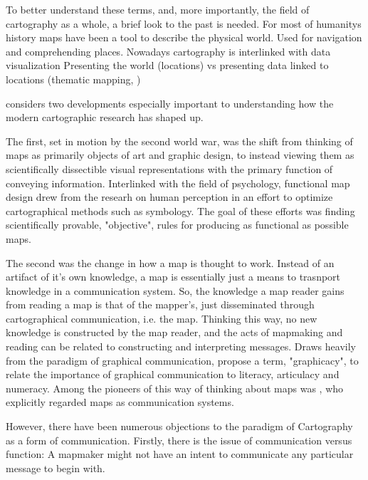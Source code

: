 To better understand these terms,
and, more importantly, the field of cartography as a whole,
a brief look to the past is needed.
For most of humanitys history maps have been a tool to describe the physical world.
Used for navigation and comprehending places.
Nowadays cartography is interlinked with data visualization
Presenting the world (locations) vs presenting data linked to locations (thematic mapping, \parencite{tyn1992})

\textcite{mac2004} considers two developments especially important
to understanding how the modern cartographic research has shaped up.

The first, set in motion by the second world war, was
the shift from thinking of maps as primarily objects of art and graphic design,
to instead viewing them as scientifically dissectible visual representations
with the primary function of conveying information.
Interlinked with the field of psychology,
functional map design drew from the researh on human perception
in an effort to optimize cartographical methods such as symbology.
The goal of these efforts was finding scientifically provable, "objective", rules
for producing as functional as possible maps.

The second was the change in how a map is thought to work.
Instead of an artifact of it's own knowledge,
a map is essentially just a means to trasnport knowledge in a communication system.
So, the knowledge a map reader gains from reading a map is that of the mapper's,
just disseminated through cartographical communication, i.e. the map.
Thinking this way, no new knowledge is constructed by the map reader,  %
and the acts of mapmaking and reading can be related to constructing and interpreting messages.
Draws heavily from the paradigm of graphical communication,  %
\textcite{bal1966} propose a term, "graphicacy",
to relate the importance of graphical communication to literacy, articulacy and numeracy.
Among the pioneers of this way of thinking about maps was \textcite{kol1969},
who explicitly regarded maps as communication systems.

However, there have been numerous objections to the paradigm of Cartography as a form of communication.
Firstly, there is the issue of communication versus function:
A mapmaker might not have an intent to communicate any particular message to begin with.

